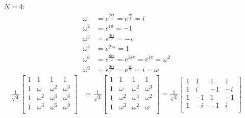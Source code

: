 \documentclass[11pt]{article}
\begin{document}
\begin{itemize}
\item[$N = 4$:] 
	\begin{align*}
		\omega &= e^{\frac{2 i \pi}{4}} = e^{\frac{i \pi}{2}} = i\\
		\omega^2 &= e^{i \pi} = -1 \\
		\omega^3 &= e^{\frac{3i\pi}{2}} = -i \\
		\omega^4 &= e^{2i\pi} = 1 \\
		\omega^6 &= e^{\frac{6 i \pi}{2}} = e^{3i\pi} = e^{i\pi} = \omega^2 \\
		\omega^9 &= e^{\frac{9 i \pi}{2}} = e^{\frac{i\pi}{2}} = i = \omega 
	\end{align*}
	\begin{align*}
	\frac{1}{\sqrt{4}}
	\begin{bmatrix}
		1 & 1 & 1 & 1 \\
		1 & \omega & \omega^2  & \omega^3 \\
		1 & \omega^2 & \omega^4 & \omega^6 \\
		1 & \omega^3 & \omega^6 & \omega^9 \\
	\end{bmatrix} &=
	\frac{1}{\sqrt{4}}
	\begin{bmatrix}
		1 & 1 & 1 & 1 \\
		1 & \omega & \omega^2  & \omega^3 \\
		1 & \omega^2 & \omega^4 & \omega^2 \\
		1 & \omega^3 & \omega^2 & \omega \\
	\end{bmatrix} =
	\frac{1}{\sqrt{4}}
	\begin{bmatrix}
		1 & 1 & 1 & 1 \\
		1 & i & -1  & -i \\
		1 & -1 & 1 & -1 \\
		1 & -i & -1 & i \\
	\end{bmatrix}
	\end{align*}



\end{itemize}
\end{document}
